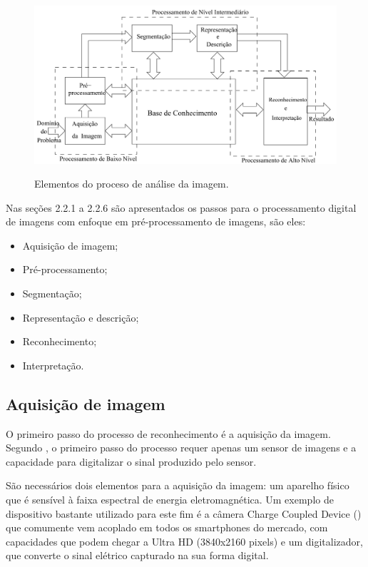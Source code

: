  \begin{figure}[htb]
	\centering
	\includegraphics[width=1.0\textwidth]{Imagens/imagem5} %
	\caption[Elementos do processo de análise de imagem.]{Elementos do proceso de análise da imagem. }
	\label{fig:tux_laplace}
\end{figure}

Nas seções 2.2.1 a 2.2.6 são apresentados os passos para o processamento digital de imagens com enfoque em pré-processamento de imagens, são eles:
\begin{itemize}
\item Aquisição de imagem;
\item Pré-processamento;
\item Segmentação;
\item Representação e descrição;
\item Reconhecimento;
\item Interpretação.
\end{itemize}

\subsection{Aquisição de imagem}
O primeiro passo do processo de reconhecimento é a aquisição da imagem. Segundo , o primeiro passo do processo requer apenas um sensor de imagens e a capacidade para digitalizar o sinal produzido pelo
sensor.

São necessários dois elementos para a aquisição da imagem: um aparelho físico que é sensível à faixa espectral de energia eletromagnética. Um exemplo de dispositivo bastante utilizado para este fim é a câmera Charge Coupled Device () que comumente vem acoplado em todos os smartphones do mercado, com capacidades que podem chegar a Ultra HD (3840x2160 pixels) e um digitalizador, que converte o sinal elétrico capturado na sua forma digital.


